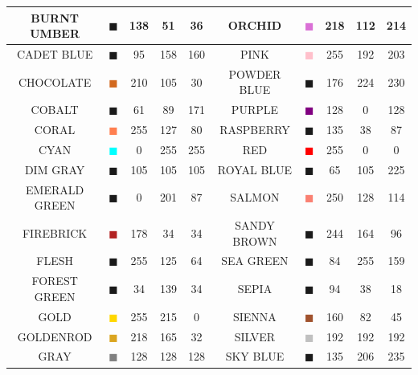 \documentclass[11pt]{book}
\begin{document}
\begin{table}[p]
\begin{center}
\begin{tabular}{|c|c|c|c|c|c||c|c|c|c|}
{\ct BURNT UMBER} & \textcolor{BURNT UMBER} {$\blacksquare$} & 138& 51& 36& {\ct ORCHID} &  \textcolor{ORCHID} {$\blacksquare$} & 218& 112& 214  \\ \hline
{\ct CADET BLUE} & \textcolor{CADET BLUE} {$\blacksquare$} & 95& 158& 160& {\ct PINK} &  \textcolor{PINK} {$\blacksquare$} & 255& 192& 203  \\ \hline
{\ct CHOCOLATE} & \textcolor{CHOCOLATE} {$\blacksquare$} & 210& 105& 30& {\ct POWDER BLUE} &  \textcolor{POWDER BLUE} {$\blacksquare$} & 176& 224& 230  \\ \hline
{\ct COBALT} & \textcolor{COBALT} {$\blacksquare$} & 61& 89& 171& {\ct PURPLE} &  \textcolor{PURPLE} {$\blacksquare$} & 128& 0& 128  \\ \hline
{\ct CORAL} & \textcolor{CORAL} {$\blacksquare$} & 255& 127& 80& {\ct RASPBERRY} &  \textcolor{RASPBERRY} {$\blacksquare$} & 135& 38& 87  \\ \hline
{\ct CYAN} & \textcolor{CYAN} {$\blacksquare$} & 0& 255& 255& {\ct RED} &  \textcolor{RED} {$\blacksquare$} & 255& 0& 0  \\ \hline
{\ct DIM GRAY } & \textcolor{DIM GRAY } {$\blacksquare$} & 105& 105& 105& {\ct ROYAL BLUE} &  \textcolor{ROYAL BLUE} {$\blacksquare$} & 65& 105& 225  \\ \hline
{\ct EMERALD GREEN} & \textcolor{EMERALD GREEN} {$\blacksquare$} & 0& 201& 87& {\ct SALMON} &  \textcolor{SALMON} {$\blacksquare$} & 250& 128& 114  \\ \hline
{\ct FIREBRICK} & \textcolor{FIREBRICK} {$\blacksquare$} & 178& 34& 34& {\ct SANDY BROWN} &  \textcolor{SANDY BROWN} {$\blacksquare$} & 244& 164& 96  \\ \hline
{\ct FLESH} & \textcolor{FLESH} {$\blacksquare$} & 255& 125& 64& {\ct SEA GREEN} &  \textcolor{SEA GREEN} {$\blacksquare$} & 84& 255& 159  \\ \hline
{\ct FOREST GREEN} & \textcolor{FOREST GREEN} {$\blacksquare$} & 34& 139& 34& {\ct SEPIA} &  \textcolor{SEPIA} {$\blacksquare$} & 94& 38& 18  \\ \hline
{\ct GOLD } & \textcolor{GOLD } {$\blacksquare$} & 255& 215& 0& {\ct SIENNA} &  \textcolor{SIENNA} {$\blacksquare$} & 160& 82& 45  \\ \hline
{\ct GOLDENROD} & \textcolor{GOLDENROD} {$\blacksquare$} & 218& 165& 32& {\ct SILVER} &  \textcolor{SILVER} {$\blacksquare$} & 192& 192& 192  \\ \hline
{\ct GRAY} & \textcolor{GRAY} {$\blacksquare$} & 128& 128& 128& {\ct SKY BLUE} &  \textcolor{SKY BLUE} {$\blacksquare$} & 135& 206& 235  \\ \hline

\end{tabular}
\end{center}
\end{table}
\end{document}

